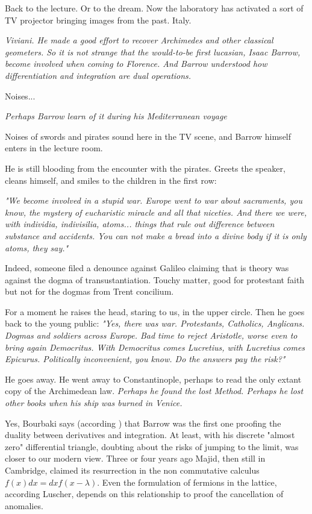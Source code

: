 \documentclass[a4paper,10pt]{article}
\begin{document}
Back to the lecture. Or to the dream. 
Now the laboratory  has activated a sort of TV projector
bringing images from the past. Italy.  

{\it Viviani. He made a good effort to recover Archimedes and other classical
geometers. So it is not strange that the would-to-be first lucasian,
Isaac Barrow, become involved when coming to Florence. And Barrow
understood how differentiation and integration are
dual operations.}

Noises...

{\it Perhaps Barrow learn of it during his Mediterranean voyage}

Noises
of swords and pirates sound here in the TV scene, and Barrow himself
enters in the lecture room. 

He is still blooding from the encounter with the pirates. Greets the
speaker, cleans himself, and smiles to
the children in the
first row: 

{\it "We become involved in a stupid war. Europe went to war about
sacraments, you know, the mystery of eucharistic miracle and all that 
niceties. And there we were, with individia, indivisilia, atoms... things
that  rule out difference between substance and accidents. You can not
make a bread into a divine body if it is only atoms, they say."} 

Indeed, someone filed a denounce against Galileo claiming that is
theory was against the dogma of transustantiation\cite{redondi}. Touchy 
matter, good
for protestant faith but not for the dogmas from Trent concilium. 

For a moment he raises the head, staring to us, in the upper circle. Then
he goes back to the young public: {\it "Yes, there was war.
 Protestants, Catholics, Anglicans.
Dogmas and soldiers across Europe. Bad time to reject Aristotle, worse
even to bring again Democritus. With Democritus comes Lucretius, with
Lucretius comes Epicurus. Politically inconvenient, you know. Do  the
answers pay the risk?"}

He goes away. He went away to Constantinople, perhaps to read the only
extant copy of the Archimedean law. {\it Perhaps he found the lost Method. 
Perhaps he lost other books when his ship was burned in Venice. }

Yes, Bourbaki says (according \cite{arnold}) that Barrow was the first one
proofing the duality between derivatives and integration. At least, with
his discrete "almost zero" differential triangle, doubting about the
 risks of jumping to
the limit, was closer to our modern \cite{connes} view. Three or four
years ago Majid, then
still in Cambridge, claimed its resurrection in the non commutative calculus 
$f(x) dx = dx f(x-\lambda)$. Even the formulation of fermions in the lattice,
according Luscher, depends on this relationship to proof the
cancellation of anomalies.
\end{document}

